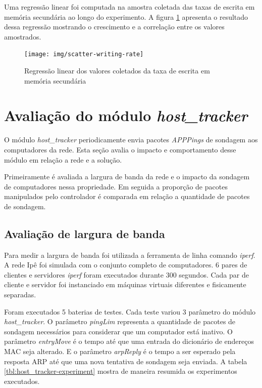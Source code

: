 Uma regressão linear foi computada na amostra coletada das taxas de escrita
em memória secundária ao longo do experimento.
A figura \ref{fig:scatter-writing-rate} apresenta o resultado dessa regressão
mostrando o crescimento e a correlação entre os valores amostrados.

\begin{figure}[!htb]
    \centering
    \label{fig:scatter-writing-rate}
    \texttt{[image: img/scatter-writing-rate]}
    \caption{Regressão linear dos valores coletados da taxa de escrita em
    memória secundária}
\end{figure}

\break
\section{Avaliação do módulo \emph{host\_tracker}}

O módulo \emph{host\_tracker} periodicamente envia pacotes \emph{APPPings} de
sondagem aos computadores da rede.
Esta seção avalia o impacto e comportamento desse módulo em relação a rede e
a solução.

Primeiramente é avaliada a largura de banda da rede e o impacto da sondagem
de computadores nessa propriedade.
Em seguida a proporção de pacotes manipulados pelo controlador é comparada
em relação a quantidade de pacotes de sondagem.

\subsection{Avaliação de largura de banda}

Para medir a largura de banda foi utilizada a ferramenta de linha comando
\emph{iperf}.
A rede Ipê foi simulada com o conjunto completo de computadores.
6 pares de clientes e servidores \emph{iperf} foram executados durante 300
segundos.
Cada par de cliente e servidor foi instanciado em máquinas virtuais
diferentes e fisicamente separadas.



Foram executados 5 baterias de testes.
Cada teste variou 3 parâmetro do módulo \emph{host\_tracker}.
O parâmetro \emph{pingLim} representa a quantidade de pacotes de sondagem
necessários para considerar que um computador está inativo.
O parâmetro \emph{entryMove} é o tempo até que uma entrada do dicionário de
endereços MAC seja alterado.
E o parâmetro \emph{arpReply} é o tempo a ser esperado pela resposta ARP até
que uma nova tentativa de sondagem seja enviada.
A tabela \ref{tbl:host_tracker-experiment} mostra de maneira resumida os
experimentos executados.

